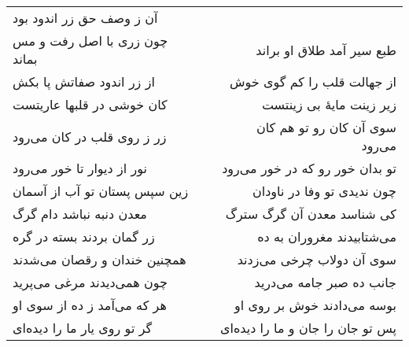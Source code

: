 \begin{center}
\begin{longtable}{l p{0.5cm} r}
آن ز وصف حق زر اندود بود
\\
چون زری با اصل رفت و مس بماند
&&
طبع سیر آمد طلاق او براند
\\
از زر اندود صفاتش پا بکش
&&
از جهالت قلب را کم گوی خوش
\\
کان خوشی در قلبها عاریتست
&&
زیر زینت مایهٔ بی زینتست
\\
زر ز روی قلب در کان می‌رود
&&
سوی آن کان رو تو هم کان می‌رود
\\
نور از دیوار تا خور می‌رود
&&
تو بدان خور رو که در خور می‌رود
\\
زین سپس پستان تو آب از آسمان
&&
چون ندیدی تو وفا در ناودان
\\
معدن دنبه نباشد دام گرگ
&&
کی شناسد معدن آن گرگ سترگ
\\
زر گمان بردند بسته در گره
&&
می‌شتابیدند مغروران به ده
\\
همچنین خندان و رقصان می‌شدند
&&
سوی آن دولاب چرخی می‌زدند
\\
چون همی‌دیدند مرغی می‌پرید
&&
جانب ده صبر جامه می‌درید
\\
هر که می‌آمد ز ده از سوی او
&&
بوسه می‌دادند خوش بر روی او
\\
گر تو روی یار ما را دیده‌ای
&&
پس تو جان را جان و ما را دیده‌ای
\\
\end{longtable}
\end{center}
